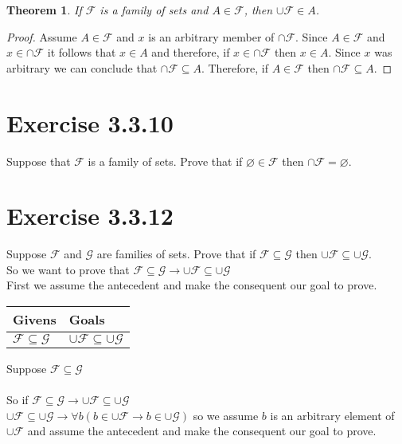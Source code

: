 \documentclass{article}
\newcommand{\n}{ \noindent }
\newcommand{\F}{\mathcal{F}}
\newcommand{\G}{\mathcal{G}}
\newtheorem*{theorem}{Theorem}  %
\begin{document}
\begin{theorem} If $\F$ is a family of sets and $A \in \F$, then $\cup \F \in A$.
\end{theorem}
\begin{proof}
Assume $A \in \F$ and $x$ is an arbitrary member of $\cap \F$. Since $A \in \F$ and $x \in \cap \F$ it follows that $x \in A$ and therefore, if $x \in \cap \F$ then $x \in A$. Since $x$ was arbitrary we can conclude that $\cap \F \subseteq A$. Therefore, if $A \in \F$ then $\cap \F \subseteq A$.
\end{proof}

\section*{Exercise 3.3.10}
Suppose that $\F$ is a family of sets. Prove that if $\varnothing \in \F$ then $\cap \F = \varnothing$.


\section*{Exercise 3.3.12}
\n Suppose $\F$ and $\G$ are families of sets. Prove that if $\F \subseteq \G$ then 
$\cup \F \subseteq \cup \G$. \\

\n So we want to prove that 
$\F \subseteq \G \rightarrow \cup \F \subseteq \cup \G$ \\

\n First we assume the antecedent and make the consequent our goal to prove.

\begin{table}[h]
\begin{tabular}{ll}
\hline
Givens & Goals   \\ \hline
$\F \subseteq \G$ & $\cup \F \subseteq \cup \G$   \\ \hline

\end{tabular}
\end{table}

\n Suppose $\F \subseteq \G$ \\
\indent [proof of $\cup \F \subseteq \cup \G$ ] \\
\n So if $\F \subseteq \G \rightarrow \cup \F \subseteq \cup \G$ \\


\n $\cup \F \subseteq \cup \G \rightarrow \forall b (b \in \cup \F \rightarrow b \in \cup \G)$ so we assume $b$ is an arbitrary element of $\cup \F$ and assume the antecedent and make the consequent our goal to prove. \\
\end{document}
